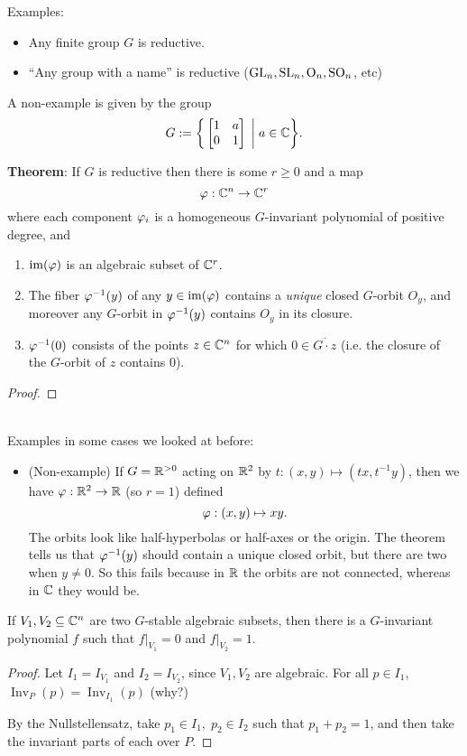 \documentclass{amsart}
\DeclareMathOperator{\Inv}{Inv}
\begin{document}
Examples:
\begin{itemize}
	\item Any finite group $G$ is reductive.
	\item ``Any group with a name'' is reductive ($\operatorname{GL}_n,\operatorname{SL}_n,\mathrm{O}_n,\operatorname{SO}_n$, etc)
\end{itemize}

\medspace

A non-example is given by the group 
$$
G := \bigg\{ \begin{bmatrix}
	1 & a \\ 0 & 1 
\end{bmatrix} \; \bigg| \; a\in \mathbb{C}\bigg\}.
$$

\textbf{Theorem}: If $G$ is reductive then there is some $r\geq 0$ and a map $$\varphi:\mathbb{C}^n\to \mathbb{C}^r$$ where each component $\varphi_i$ is a homogeneous $G$-invariant polynomial of positive degree, and 
\begin{enumerate}[(1)]
	\item $\operatorname{im}(\varphi)$ is an algebraic subset of $\mathbb{C}^r$.
	\item The fiber $\varphi^{-1}(y)$ of any $y\in \operatorname{im}(\varphi)$ contains a \textit{unique} closed $G$-orbit $O_y$, and moreover any $G$-orbit in $\varphi^{-1}(y)$ contains $O_y$ in its closure.
	\item $\varphi^{-1}(0)$ consists of the points $z\in \mathbb{C}^n$ for which $0\in \overline{G\cdot z}$ (i.e. the closure of the $G$-orbit of $z$ contains 0).
\end{enumerate} 
\begin{proof}
	
\end{proof}\\

Examples in some cases we looked at before:
\begin{itemize}
	\item (Non-example) If $G=\mathbb{R}^{>0}$ acting on $\mathbb{R}^2$ by $t:(x,y)\mapsto (tx,t^{-1}y)$, then we have $\varphi:\mathbb{R}^2\to \mathbb{R}$ (so $r=1$) defined
	$$
	\varphi:(x,y)\mapsto xy.
	$$
	The orbits look like half-hyperbolas or half-axes or the origin. The theorem tells us that $\varphi^{-1}(y)$ should contain a unique closed orbit, but there are two when $y\neq 0$. So this fails because in $\mathbb{R}$ the orbits are not connected, whereas in $\mathbb{C}$ they would be.
\end{itemize}

\medspace

If $V_1,V_2\subseteq \mathbb{C}^n$ are two $G$-stable algebraic subsets, then there is a $G$-invariant polynomial $f$ such that $f|_{V_1}=0$ and $f|_{V_2}=1$.
\begin{proof}
	Let $I_1=I_{V_1}$ and $I_2=I_{V_2}$, since $V_1,V_2$ are algebraic. For all $p\in I_1$, $\Inv_P(p)=\Inv_{I_1}(p)$ (why?)
	
	By the Nullstellensatz, take $p_1\in I_1,\;p_2\in I_2$ such that $p_1+p_2=1$, and then take the invariant parts of each over $P$.
\end{proof}\\
\end{document}
